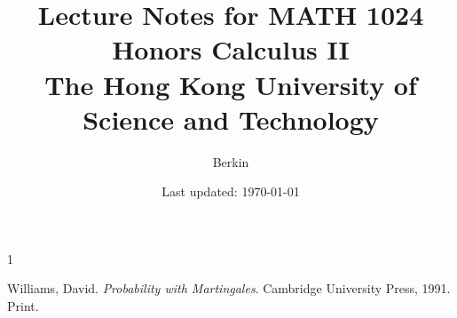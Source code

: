 \documentclass[letterpaper, 12pt]{article}
\newcommand{\1}{\mathds{1}}	%
\theoremstyle{definition}
\begin{document}

\title{Lecture Notes for MATH 1024\\ Honors Calculus II \\[1em]
\normalsize The Hong Kong University of Science and Technology}


\author{\normalsize Berkin}
\date{\normalsize\vspace{-1ex} Last updated: \today}


\maketitle
\tableofcontents\label{sec:contents}








\begin{thebibliography}{1}

   Williams, David.
   \textit{Probability with Martingales}.
   Cambridge University Press, 1991.
   Print.


\end{thebibliography}

\end{document}
